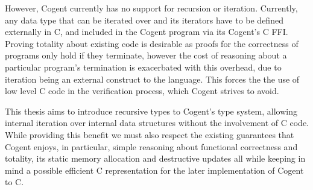 However, Cogent currently has no support for recursion or iteration.
Currently, any data type that can be iterated over and its iterators have to be defined externally in C,
  and included in the Cogent program via its Cogent's C FFI.
Proving totality about existing code is desirable as proofs for the correctness of programs only hold
  if they terminate, however the cost of reasoning about a particular program's termination is
  exacerbated with this overhead, due to iteration being an external construct to the language.
This forces the the use of low level C code in the verification process, which Cogent strives to avoid.

This thesis aims to introduce recursive types to Cogent's type system, allowing internal iteration over
  internal data structures without the involvement of C code.
While providing this benefit we must also respect the existing guarantees that Cogent enjoys,
  in particular, simple reasoning about functional correctness and totality,
  its static memory allocation and destructive updates all while keeping in mind
  a possible efficient C representation for the later implementation of Cogent to C.